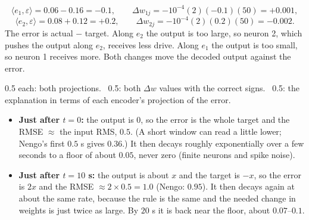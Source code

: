 \documentclass[11pt,letterpaper]{article}
\newcommand{\ans}[1]{\par\vspace{4pt}{\bfseries #1}\quad}
\begin{document}
\ans{(a) [2]}
\[
\langle e_1, \varepsilon\rangle = 0.06 - 0.16 = -0.1, \qquad \Delta w_{1j} = -10^{-4}(2)(-0.1)(50) = \mathbf{+0.001},
\]
\[
\langle e_2, \varepsilon\rangle = 0.08 + 0.12 = +0.2, \qquad \Delta w_{2j} = -10^{-4}(2)(0.2)(50) = \mathbf{-0.002}.
\]
The error is actual $-$ target. Along $e_2$ the output is too large, so neuron 2, which pushes the output along $e_2$, receives less drive. Along $e_1$ the output is too small, so neuron 1 receives more. Both changes move the decoded output against the error.
\begin{marking}
0.5 each: both projections. \ 0.5: both $\Delta w$ values with the correct signs. \ 0.5: the explanation in terms of each encoder's projection of the error.
\end{marking}

\ans{(b) [2]}
\begin{itemize}[leftmargin=1.2em, itemsep=1pt]
\item \textbf{Just after $t = 0$:} the output is $0$, so the error is the whole target and the RMSE $\approx$ the input RMS, $\mathbf{0.5}$. (A short window can read a little lower; Nengo's first $0.5$ s gives $0.36$.) It then decays roughly exponentially over a few seconds to a floor of about $0.05$, never zero (finite neurons and spike noise).
\item \textbf{Just after $t = 10$ s:} the output is about $x$ and the target is $-x$, so the error is $2x$ and the RMSE $\approx 2 \times 0.5 = \mathbf{1.0}$ (Nengo: $0.95$). It then decays again at about the same rate, because the rule is the same and the needed change in weights is just twice as large. By $20$ s it is back near the floor, about $0.07$--$0.1$.
\end{itemize}
\begin{center}
\end{center}
\end{document}
